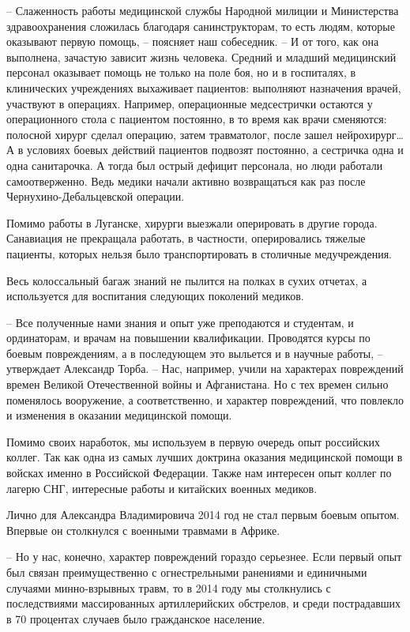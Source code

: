 – Слаженность работы медицинской службы Народной милиции и Министерства
здравоохранения сложилась благодаря санинструкторам, то есть людям, которые
оказывают первую помощь, – поясняет наш собеседник. – И от того, как она
выполнена, зачастую зависит жизнь человека. Средний и младший медицинский
персонал оказывает помощь не только на поле боя, но и в госпиталях, в
клинических учреждениях выхаживает пациентов: выполняют назначения врачей,
участвуют в операциях. Например, операционные медсестрички остаются у
операционного стола с пациентом постоянно, в то время как врачи сменяются:
полосной хирург сделал операцию, затем травматолог, после зашел нейрохирург… А
в условиях боевых действий пациентов подвозят постоянно, а сестричка одна и
одна санитарочка. А тогда был острый дефицит персонала, но люди работали
самоотверженно. Ведь медики начали активно возвращаться как раз после
Чернухино-Дебальцевской операции.

Помимо работы в Луганске, хирурги выезжали оперировать в другие города.
Санавиация не прекращала работать, в частности, оперировались тяжелые пациенты,
которых нельзя было транспортировать в столичные медучреждения. 

Весь колоссальный багаж знаний не пылится на полках в сухих отчетах, а
используется для воспитания следующих поколений медиков.

– Все полученные нами знания и опыт уже преподаются и студентам, и ординаторам,
и врачам на повышении квалификации. Проводятся курсы по боевым повреждениям, а
в последующем это выльется и в научные работы, – утверждает Александр Торба. –
Нас, например, учили на характерах повреждений времен Великой Отечественной
войны и Афганистана. Но с тех времен сильно поменялось вооружение, а
соответственно, и характер повреждений, что повлекло и изменения в оказании
медицинской помощи.

Помимо своих наработок, мы используем в первую очередь опыт российских коллег.
Так как одна из самых лучших доктрина оказания медицинской помощи в войсках
именно в Российской Федерации. Также нам интересен опыт коллег по лагерю СНГ,
интересные работы и китайских военных медиков. 

Лично для Александра Владимировича 2014 год не стал первым боевым опытом.
Впервые он столкнулся с военными травмами в Африке. 

– Но у нас, конечно, характер повреждений гораздо серьезнее. Если первый опыт
был связан преимущественно с огнестрельными ранениями и единичными случаями
минно-взрывных травм, то в 2014 году мы столкнулись с последствиями
массированных артиллерийских обстрелов, и среди пострадавших в 70 процентах
случаев было гражданское население. 

